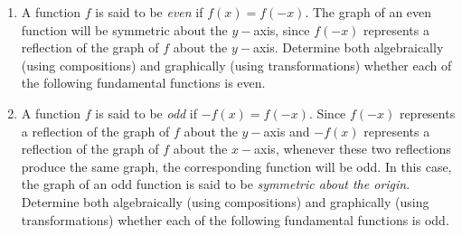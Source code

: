 \documentclass[12pt]{book}
\theoremstyle{definition}
\begin{document}
\begin{enumerate}[resume]
\item A function $f$ is said to be {\it even} if $f(x)=f(-x)$.  The graph of an even function will be symmetric about the $y-$axis, since $f(-x)$ represents a reflection of the graph of $f$ about the $y-$axis.  Determine both algebraically (using compositions) and graphically (using transformations) whether each of the following fundamental functions is even.
\begin{enumerate}
\end{enumerate}
\item A function $f$ is said to be {\it odd} if $-f(x)=f(-x)$.  Since $f(-x)$ represents a reflection of the graph of $f$ about the $y-$axis and $-f(x)$ represents a reflection of the graph of $f$ about the $x-$axis, whenever these two reflections produce the same graph, the corresponding function will be odd.   In this case, the graph of an odd function is said to be \textit{symmetric about the origin}.  Determine both algebraically (using compositions) and graphically (using transformations) whether each of the following fundamental functions is odd.
\begin{enumerate}
\end{enumerate}
\end{enumerate}
\end{document}
